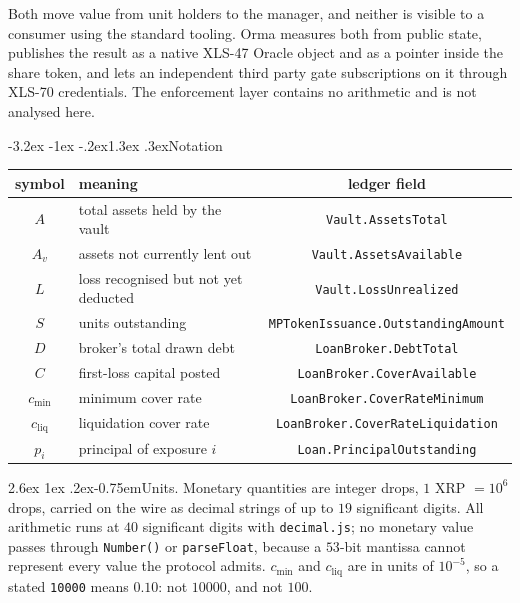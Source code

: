 \documentclass[11pt]{article}
\makeatletter
\renewcommand\subsection{\@startsection{subsection}{2}{\z@}%
  {-3.2ex \@plus -1ex \@minus -.2ex}{1.3ex \@plus .3ex}{\normalfont\large\bfseries}}
\renewcommand\paragraph{\@startsection{paragraph}{4}{\z@}%
  {2.6ex \@plus 1ex \@minus .2ex}{-0.75em}{\normalfont\normalsize\bfseries}}
\theoremstyle{orma}
\theoremstyle{ormaupright}
\makeatother
\begin{document}
Both move value from unit holders to the manager, and neither is visible to a
consumer using the standard tooling. Orma measures both from public state, publishes the
result as a native XLS-47 Oracle object and as a pointer inside the share token, and lets an
independent third party gate subscriptions on it through XLS-70 credentials. The enforcement
layer contains no arithmetic and is not analysed here.

\subsection{Notation}

\begin{center}
\setlength{\tabcolsep}{7pt}
\begin{tabular}{clc}
\toprule
symbol & meaning & ledger field \\
\midrule
$A$ & total assets held by the vault & \texttt{Vault.AssetsTotal} \\
$A_v$ & assets not currently lent out & \texttt{Vault.AssetsAvailable} \\
$L$ & loss recognised but not yet deducted & \texttt{Vault.LossUnrealized} \\
$S$ & units outstanding & \texttt{MPTokenIssuance.OutstandingAmount} \\
$D$ & broker's total drawn debt & \texttt{LoanBroker.DebtTotal} \\
$C$ & first-loss capital posted & \texttt{LoanBroker.CoverAvailable} \\
$c_{\min}$ & minimum cover rate & \texttt{LoanBroker.CoverRateMinimum} \\
$c_{\mathrm{liq}}$ & liquidation cover rate & \texttt{LoanBroker.CoverRateLiquidation} \\
$p_i$ & principal of exposure $i$ & \texttt{Loan.PrincipalOutstanding} \\
\bottomrule
\end{tabular}
\end{center}

\paragraph{Units.} Monetary quantities are integer drops, $1$ XRP $= 10^{6}$ drops, carried
on the wire as decimal strings of up to $19$ significant digits. All arithmetic runs at $40$
significant digits with \texttt{decimal.js}; no monetary value passes through
\texttt{Number()} or \texttt{parseFloat}, because a $53$-bit mantissa cannot represent every
value the protocol admits. $c_{\min}$ and $c_{\mathrm{liq}}$ are in units of $10^{-5}$, so a
stated \texttt{10000} means $0.10$: not $10000$, and not $100$.
\end{document}
